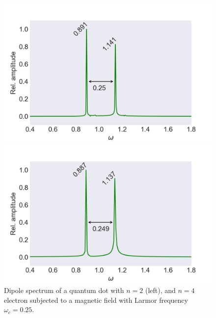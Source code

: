 \begin{figure}
    \centering
    \begin{minipage}{0.49\textwidth}
        \includegraphics[clip=2em 0em 10em 0em, width=\textwidth]
        {results/figures/B_field/n=2/b_spectrum_omc025.png}
    \end{minipage}\hfill 
    \begin{minipage}{0.49\textwidth}
        \includegraphics[clip=0em 0em 10em 0em, width=\textwidth]
        {results/figures/B_field/n=4/b_spectrum_n=4_omc=025.png}
    \end{minipage}
    \caption{Dipole spectrum of a quantum dot with $n=2$ (left), and $n=4$ electron 
    subjected to a magnetic field with Larmor frequency $\omega_c=0.25$.}
    \label{fig:b_omc025}
\end{figure}
